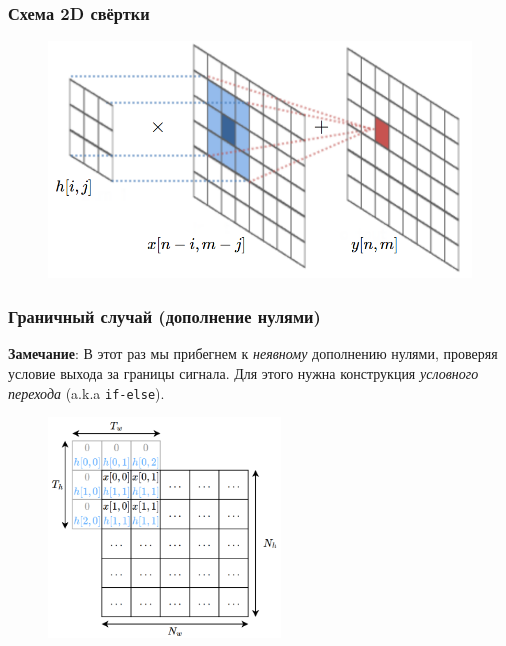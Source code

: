 \documentclass{beamer}
\begin{document}
    \begin{frame}
        \frametitle{Схема 2D свёртки}
        \begin{figure}[!tbp]
           \centering
           \includegraphics[width=\textwidth]{pics/2Dconv.png}
       \end{figure}
    \end{frame}
    \begin{frame}[fragile]
        \frametitle{Граничный случай (дополнение нулями)}
        \justifying
        {\bf Замечание}: В этот раз мы прибегнем к {\it неявному} дополнению нулями, проверяя условие выхода за границы сигнала. 
        Для этого нужна конструкция {\it условного перехода} (a.k.a {\texttt{if-else}}).
        \begin{figure}[!tbp]
            \centering
            \includegraphics[width=0.55\textwidth]{pics/border.png}
        \end{figure}
    \end{frame}
\end{document}
